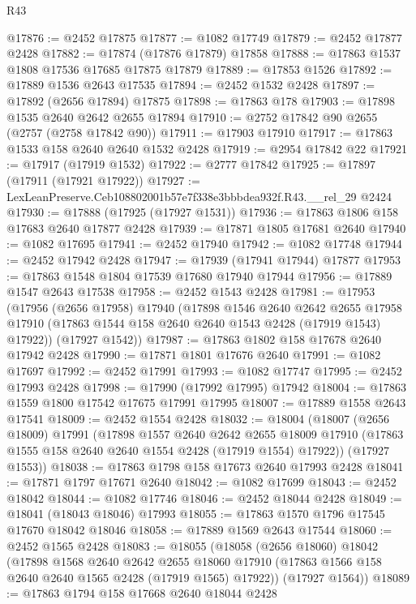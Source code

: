 \begin{lexlean}{R43}
\begin{coremodule}
@17876 := @2452 @17875
@17877 := @1082 @17749
@17879 := @2452 @17877 @2428
@17882 := @17874 (@17876 @17879) @17858
@17888 := @17863 @1537 @1808 @17536 @17685 @17875 @17879
@17889 := @17853 @1526
@17892 := @17889 @1536 @2643 @17535
@17894 := @2452 @1532 @2428
@17897 := @17892 (@2656 @17894) @17875
@17898 := @17863 @178
@17903 := @17898 @1535 @2640 @2642 @2655 @17894
@17910 := @2752 @17842 @90 @2655 (@2757 (@2758 @17842 @90))
@17911 := @17903 @17910
@17917 := @17863 @1533 @158 @2640 @2640 @1532 @2428
@17919 := @2954 @17842 @22
@17921 := @17917 (@17919 @1532)
@17922 := @2777 @17842
@17925 := @17897 (@17911 (@17921 @17922))
@17927 := LexLeanPreserve.Ceb108802001b57e7f338e3bbbdea932f.R43.__rel_29 @2424
@17930 := @17888 (@17925 (@17927 @1531))
@17936 := @17863 @1806 @158 @17683 @2640 @17877 @2428
@17939 := @17871 @1805 @17681 @2640
@17940 := @1082 @17695
@17941 := @2452 @17940
@17942 := @1082 @17748
@17944 := @2452 @17942 @2428
@17947 := @17939 (@17941 @17944) @17877
@17953 := @17863 @1548 @1804 @17539 @17680 @17940 @17944
@17956 := @17889 @1547 @2643 @17538
@17958 := @2452 @1543 @2428
@17981 := @17953
    (@17956
      (@2656 @17958)
      @17940
      (@17898
        @1546
        @2640
        @2642
        @2655
        @17958
        @17910
        (@17863 @1544 @158 @2640 @2640 @1543 @2428 (@17919 @1543) @17922))
      (@17927 @1542))
@17987 := @17863 @1802 @158 @17678 @2640 @17942 @2428
@17990 := @17871 @1801 @17676 @2640
@17991 := @1082 @17697
@17992 := @2452 @17991
@17993 := @1082 @17747
@17995 := @2452 @17993 @2428
@17998 := @17990 (@17992 @17995) @17942
@18004 := @17863 @1559 @1800 @17542 @17675 @17991 @17995
@18007 := @17889 @1558 @2643 @17541
@18009 := @2452 @1554 @2428
@18032 := @18004
    (@18007
      (@2656 @18009)
      @17991
      (@17898
        @1557
        @2640
        @2642
        @2655
        @18009
        @17910
        (@17863 @1555 @158 @2640 @2640 @1554 @2428 (@17919 @1554) @17922))
      (@17927 @1553))
@18038 := @17863 @1798 @158 @17673 @2640 @17993 @2428
@18041 := @17871 @1797 @17671 @2640
@18042 := @1082 @17699
@18043 := @2452 @18042
@18044 := @1082 @17746
@18046 := @2452 @18044 @2428
@18049 := @18041 (@18043 @18046) @17993
@18055 := @17863 @1570 @1796 @17545 @17670 @18042 @18046
@18058 := @17889 @1569 @2643 @17544
@18060 := @2452 @1565 @2428
@18083 := @18055
    (@18058
      (@2656 @18060)
      @18042
      (@17898
        @1568
        @2640
        @2642
        @2655
        @18060
        @17910
        (@17863 @1566 @158 @2640 @2640 @1565 @2428 (@17919 @1565) @17922))
      (@17927 @1564))
@18089 := @17863 @1794 @158 @17668 @2640 @18044 @2428

\end{coremodule}
\end{lexlean}
